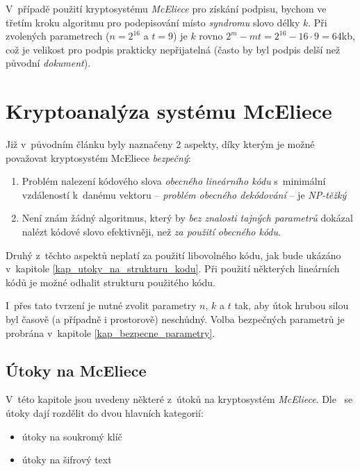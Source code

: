 \documentclass[thesis=M,czech,hidelinks]{FITthesis}[2012/06/26]
\newcommand{\0}{{\textcolor[gray]{0.80}{0}}}
\begin{document}
V~případě použití kryptosystému \emph{McEliece} pro získání podpisu, bychom ve
třetím kroku algoritmu pro podepisování místo \emph{syndromu} slovo délky $k$.
Při zvolených parametrech ($n=2^{16}$ a $t=9$) je $k$ rovno $2^m - m t = 2^{16}
- 16 \cdot 9 = 64$\;kb, což je velikost pro podpis prakticky nepřijatelná (často
by byl podpis delší než původní \emph{dokument}).

\clearpage


\section{Kryptoanalýza systému McEliece}

Již v~původním článku \cite{McEliece} byly naznačeny 2 aspekty, díky kterým je
možné považovat kryptosystém McEliece \emph{bezpečný}:


\begin{enumerate}
    \item Problém nalezení kódového slova \emph{obecného lineárního kódu}
        s~minimální vzdáleností k~danému vektoru
        -- \emph{problém obecného dekódování} -- je \emph{NP-těžký}
        \cite{Berlekamp}
    \item Není znám žádný algoritmus, který by \emph{bez znalosti tajných parametrů}
        dokázal nalézt kódové slovo efektivněji, než \emph{za použití obecného kódu}.
\end{enumerate}


Druhý z~těchto aspektů neplatí za použití libovolného kódu, jak bude ukázáno
v~kapitole \ref{kap_utoky_na_strukturu_kodu}. Při použití některých lineárních
kódů je možné odhalit strukturu použitého kódu.

I~přes tato tvrzení je nutné zvolit parametry $n$, $k$ a $t$ tak, aby útok
hrubou silou byl časově (a případně i prostorově) neschůdný. Volba bezpečných
parametrů je probrána v~kapitole \ref{kap_bezpecne_parametry}.


\subsection{Útoky na McEliece}

V~této kapitole jsou uvedeny některé z~útoků na kryptosystém \emph{McEliece}.
Dle~\cite{Engelbert} se útoky dají rozdělit do dvou hlavních kategorií:

\begin{itemize}
    \item útoky na soukromý klíč
    \item útoky na šifrový text
\end{itemize}
\end{document}
